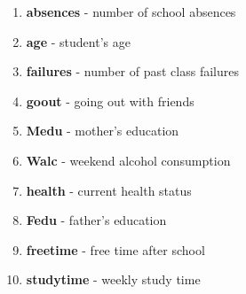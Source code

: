 \documentclass[twoside,openright,titlepage,numbers=noenddot,headinclude,%
               footinclude=true,cleardoublepage=empty,abstractoff,BCOR=5mm,%
               paper=a4,fontsize=11pt,ngerman,american]{scrreprt}
\numberwithin{theorem}{chapter}
\numberwithin{definition}{chapter}
\numberwithin{algorithm}{chapter}
\numberwithin{figure}{chapter}
\numberwithin{table}{chapter}
\numberwithin{equation}{chapter}
\begin{document}
\begin{itemize}
\begin{enumerate} 
 \item \textbf{absences} - number of school absences
 \item \textbf{age} - student's age 
 \item \textbf{failures} - number of past class failures
 \item \textbf{goout} - going out with friends
 \item \textbf{Medu} - mother's education
 \item \textbf{Walc} - weekend alcohol consumption
 \item \textbf{health} - current health status
 \item \textbf{Fedu} - father's education
 \item \textbf{freetime} - free time after school
 \item \textbf{studytime} - weekly study time
\end{enumerate}

\end{itemize} 



\end{document}
